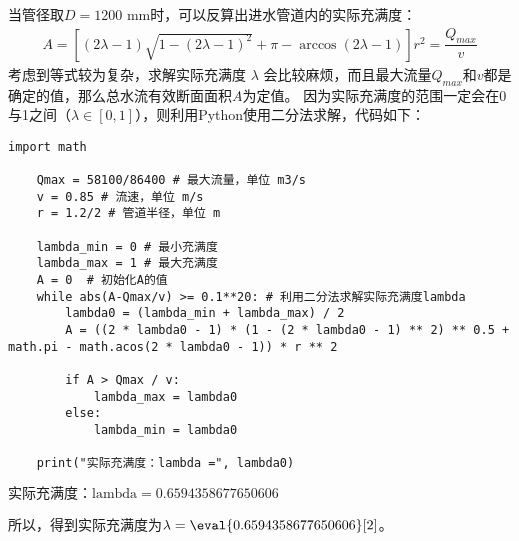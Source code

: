 当管径取$D=1200$ mm时，可以反算出进水管道内的实际充满度：
\begin{align}
	A=\left[(2\lambda -1)\sqrt{1 - (2\lambda -1)^2} +\pi-\arccos{(2\lambda -1)}\right]  r^2 = \dfrac{Q_{max}}{v}
\end{align}
考虑到等式较为复杂，求解实际充满度 $\lambda$ 会比较麻烦，而且最大流量$Q_{max}$和$v$都是确定的值，那么总水流有效断面面积$A$为定值。
因为实际充满度的范围一定会在0与1之间（$\lambda\in [0,1]$），则利用Python使用二分法求解，代码如下：
\begin{lstlisting}[style=python2]
	import math

	Qmax = 58100/86400 # 最大流量，单位 m3/s
	v = 0.85 # 流速，单位 m/s
	r = 1.2/2 # 管道半径，单位 m

	lambda_min = 0 # 最小充满度
	lambda_max = 1 # 最大充满度
	A = 0  # 初始化A的值
	while abs(A-Qmax/v) >= 0.1**20: # 利用二分法求解实际充满度lambda
		lambda0 = (lambda_min + lambda_max) / 2
		A = ((2 * lambda0 - 1) * (1 - (2 * lambda0 - 1) ** 2) ** 0.5 + math.pi - math.acos(2 * lambda0 - 1)) * r ** 2

		if A > Qmax / v:
			lambda_max = lambda0
		else:
			lambda_min = lambda0

	print("实际充满度：lambda =", lambda0)
\end{lstlisting}
\begin{calculating}
	$\text{实际充满度：lambda} = 0.6594358677650606$
\end{calculating}
所以，得到实际充满度为$\lambda = \eval{0.6594358677650606}[2]$。

